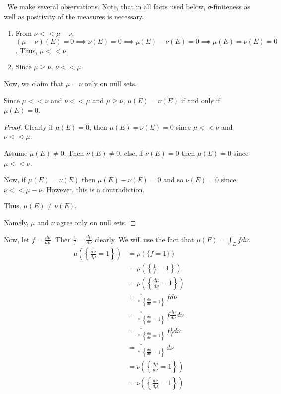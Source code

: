 \documentclass[12pt]{Qual}
\begin{document}
\begin{solution}$\,$
We make several observations. Note, that in all facts used below, $\sigma$-finiteness as well as positivity of the measures is necessary.
\begin{enumerate}
    \item From $\nu<<\mu-\nu$, $\displaystyle(\mu-\nu)(E)=0\implies\nu(E)=0\implies  \mu(E)-\nu(E)=0\implies \mu(E)=\nu(E)=0$. Thus, $\mu<<\nu$.
    \item Since $\mu\ge\nu$, $\nu<<\mu$.
\end{enumerate}
Now, we claim that $\mu=\nu$ only on null sets.

\begin{claim} Since $\mu<<\nu$ and $\nu<<\mu$ and $\mu\ge\nu$, $\mu(E)=\nu(E)$ if and only if $\mu(E)=0$.
\begin{proof} \boxed{\impliedby} Clearly if $\mu(E)=0$, then $\mu(E)=\nu(E)=0$ since $\mu<<\nu$ and $\nu<<\mu$.

\boxed{\implies} Assume $\mu(E)\not=0$. Then $\nu(E)\not=0$, else, if $\nu(E)=0$ then $\mu(E)=0$ since $\mu<<\nu$.

Now, if $\mu(E)=\nu(E)$ then $\mu(E)-\nu(E)=0$ and so $\nu(E)=0$ since $\nu<<\mu-\nu$. However, this is a contradiction.

Thus, $\mu(E)\not=\nu(E)$.

Namely, $\mu$ and $\nu$ agree only on null sets.
\end{proof}
\end{claim}

Now, let $f=\frac{d\nu}{d\mu}$. Then $\frac{1}{f}=\frac{d\mu}{d\nu}$ clearly. We will use the fact that $\displaystyle\mu(E)=\int_Efd\nu$. \begin{align*}
    \mu\left(\left\{\frac{d\nu}{d\mu}=1\right\}\right)&=\mu\left(\{f=1\}\right)\\
    &=\mu\left(\left\{\frac{1}{f}=1\right\}\right)\\
    &=\mu\left(\left\{\frac{d\mu}{d\nu}=1\right\}\right)\\
    &=\int_{\left\{\frac{d\mu}{d\nu}=1\right\}}fd\nu\\
    &=\int_{\left\{\frac{d\mu}{d\nu}=1\right\}}f\frac{d\mu}{d\nu}d\nu\\
    &=\int_{\left\{\frac{d\mu}{d\nu}=1\right\}}f\frac{1}{f}d\nu\\
    &=\int_{\left\{\frac{d\mu}{d\nu}=1\right\}}d\nu\\
    &=\nu\left(\left\{\frac{d\mu}{d\nu}=1\right\}\right)\\
    &=\nu\left(\left\{\frac{d\nu}{d\mu}=1\right\}\right)
\end{align*}


\end{solution}
\end{document}
